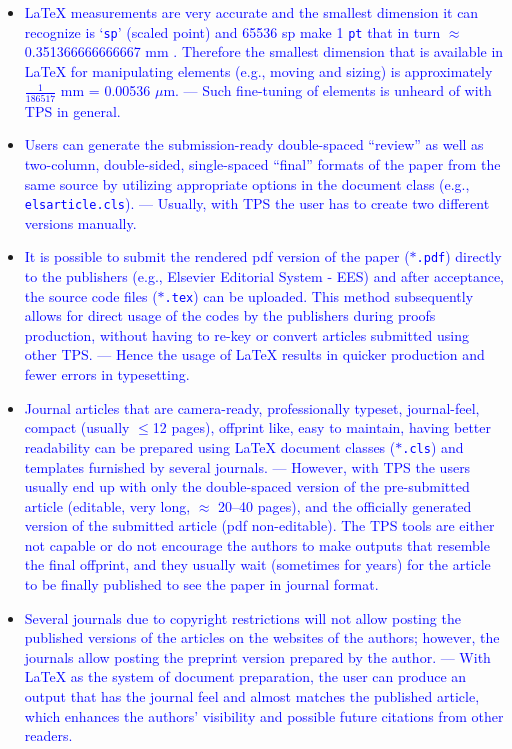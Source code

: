 \documentclass[phd,showgrids]{ndsu-thesis-2022}
\newcommand\italk[1]{\textcolor{blue}{#1}}  %
\newcommand\lx{\LaTeX\xspace}
\newcommand\vb[1]{\textcolor{blue}{\texttt{#1}}}%
\begin{document}
\begin{itemize}[leftmargin=*, itemsep=0pt, parsep=3pt]
\item \italk{\lx measurements are very accurate and the smallest dimension it can recognize is `\vb{sp}' (scaled point) and 65536 sp make 1 \vb{pt} that in turn $\approx$ 0.351366666666667 mm \citep{Wikibook2016}. Therefore the smallest dimension that is available in \lx for manipulating elements (e.g., moving and sizing) is approximately $\frac{1}{186517}$ mm = 0.00536 $\mu$m. --- Such fine-tuning of elements is unheard of with TPS in general.} 

\item \italk{Users can generate the submission-ready double-spaced ``review'' as well as two-column, double-sided, single-spaced ``final'' formats of the paper from the same source by utilizing appropriate options in the document class (e.g., \vb{elsarticle.cls}). --- Usually, with TPS the user has to create two different versions manually.}   

\item \italk{It is possible to submit the rendered pdf version of the paper ($\ast$\vb{.pdf}) directly to the publishers (e.g., Elsevier Editorial System - EES) and after acceptance, the source code files ($\ast$\vb{.tex}) can be uploaded.  This method subsequently allows for direct usage of the codes by the publishers during proofs production, without having to re-key or convert articles submitted using other TPS. --- Hence the usage of \lx results in quicker production and fewer errors in typesetting.}   

\item \italk{Journal articles that are camera-ready, professionally typeset, journal-feel, compact (usually $\le$12 pages), offprint like, easy to maintain, having better readability can be prepared using \lx document classes ($\ast$\vb{.cls}) and templates furnished by several journals. --- However, with TPS the users usually end up with only the double-spaced version of the pre-submitted article (editable, very long, $\approx$ 20--40 pages), and the officially generated version of the submitted article (pdf non-editable). The TPS tools are either not capable or do not encourage the authors to make outputs that resemble the final offprint, and they usually wait (sometimes for years) for the article to be finally published to see the paper in journal format.}    

\item \italk{Several journals due to copyright restrictions will not allow posting the published versions of the articles on the websites of the authors; however, the journals allow posting the preprint version prepared by the author. --- With \lx as the system of document preparation, the user can produce an output that has the journal feel and almost matches the published article, which enhances the authors' visibility and possible future citations from other readers.}  


\end{itemize}
\end{document}
